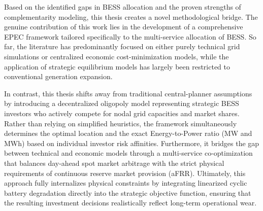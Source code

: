 Based on the identified gaps in BESS allocation and the proven strengths of complementarity modeling, this thesis creates a novel methodological bridge. The genuine contribution of this work lies in the development of a comprehensive EPEC framework tailored specifically to the multi-service allocation of BESS. So far, the literature has predominantly focused on either purely technical grid simulations or centralized economic cost-minimization models, while the application of strategic equilibrium models has largely been restricted to conventional generation expansion.

In contrast, this thesis shifts away from traditional central-planner assumptions by introducing a decentralized oligopoly model representing strategic BESS investors who actively compete for nodal grid capacities and market shares. Rather than relying on simplified heuristics, the framework simultaneously determines the optimal location and the exact Energy-to-Power ratio (MW and MWh) based on individual investor risk affinities. Furthermore, it bridges the gap between technical and economic models through a multi-service co-optimization that balances day-ahead spot market arbitrage with the strict physical requirements of continuous reserve market provision (aFRR). Ultimately, this approach fully internalizes physical constraints by integrating linearized cyclic battery degradation directly into the strategic objective function, ensuring that the resulting investment decisions realistically reflect long-term operational wear.



